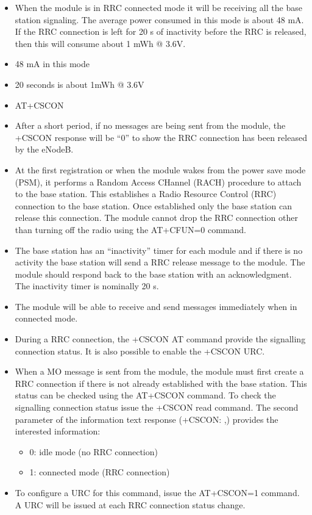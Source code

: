 \documentclass[]{article}
\providecommand{\tightlist}{%
  \setlength{\itemsep}{0pt}\setlength{\parskip}{0pt}}
\begin{document}
\begin{itemize}
\tightlist
\item
  When the module is in RRC connected mode it will be receiving all the
  base station signaling. The average power consumed in this mode is
  about 48 mA. If the RRC connection is left for 20 s of inactivity
  before the RRC is released, then this will consume about 1 mWh @ 3.6V.
\item
  48 mA in this mode
\item
  20 seconds is about 1mWh @ 3.6V
\item
  AT+CSCON
\item
  After a short period, if no messages are being sent from the module,
  the +CSCON response will be ``0'' to show the RRC connection has been
  released by the eNodeB.
\item
  At the first registration or when the module wakes from the power save
  mode (PSM), it performs a Random Access CHannel (RACH) procedure to
  attach to the base station. This establishes a Radio Resource Control
  (RRC) connection to the base station. Once established only the base
  station can release this connection. The module cannot drop the RRC
  connection other than turning off the radio using the AT+CFUN=0
  command.
\item
  The base station has an ``inactivity'' timer for each module and if
  there is no activity the base station will send a RRC release message
  to the module. The module should respond back to the base station with
  an acknowledgment. The inactivity timer is nominally 20 s.
\item
  The module will be able to receive and send messages immediately when
  in connected mode.
\item
  During a RRC connection, the +CSCON AT command provide the signalling
  connection status. It is also possible to enable the +CSCON URC.
\item
  When a MO message is sent from the module, the module must first
  create a RRC connection if there is not already established with the
  base station. This status can be checked using the AT+CSCON command.
  To check the signalling connection status issue the +CSCON read
  command. The second parameter of the information text response
  (+CSCON: ,) provides the interested information:

  \begin{itemize}
  \tightlist
  \item
    0: idle mode (no RRC connection)
  \item
    1: connected mode (RRC connection)
  \end{itemize}
\item
  To configure a URC for this command, issue the AT+CSCON=1 command. A
  URC will be issued at each RRC connection status change.
\end{itemize}
\end{document}
